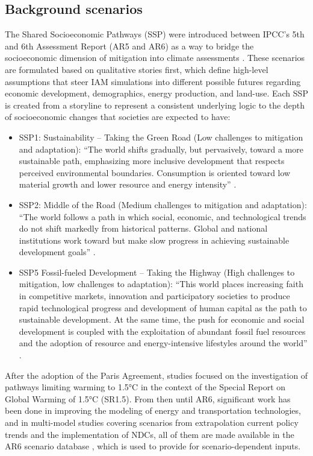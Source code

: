 \documentclass[a4paper,fleqn]{cas-dc}
\begin{document}
\subsection{Background scenarios}

The Shared Socioeconomic Pathways (SSP) were introduced between IPCC's 5th and 6th Assessment Report (AR5 and AR6) as a way to bridge the socioeconomic dimension of mitigation into climate assessments \cite{riahi_shared_2017}. These scenarios are formulated based on qualitative stories first, which define high-level assumptions that steer IAM simulations into different possible futures regarding economic development, demographics, energy production, and land-use. Each SSP is created from a storyline to represent a consistent underlying logic to the depth of socioeconomic changes that societies are expected to have:

\begin{itemize}
    \item SSP1: Sustainability – Taking the Green Road (Low challenges to mitigation and adaptation): “The world shifts gradually, but pervasively, toward a more sustainable path, emphasizing more inclusive development that respects perceived environmental boundaries. Consumption is oriented toward low material growth and lower resource and energy intensity” \cite{ssp1}.
    \item SSP2: Middle of the Road (Medium challenges to mitigation and adaptation): “The world follows a path in which social, economic, and technological trends do not shift markedly from historical patterns. Global and national institutions work toward but make slow progress in achieving sustainable development goals” \cite{ssp2}.
    \item SSP5 Fossil-fueled Development – Taking the Highway (High challenges to mitigation, low challenges to adaptation): “This world places increasing faith in competitive markets, innovation and participatory societies to produce rapid technological progress and development of human capital as the path to sustainable development. At the same time, the push for economic and social development is coupled with the exploitation of abundant fossil fuel resources and the adoption of resource and energy-intensive lifestyles around the world” \cite{ssp5}.
\end{itemize}

After the adoption of the Paris Agreement, studies focused on the investigation of pathways limiting warming to 1.5°C \cite{ipcc_wg3_an3} in the context of the Special Report on Global Warming of 1.5°C (SR1.5). From then until AR6, significant work has been done in improving the modeling of energy and transportation technologies, and in multi-model studies covering scenarios from extrapolation current policy trends and the implementation of NDCs, all of them are made available in the AR6 scenario database \cite{ar6_database}, which is used to provide for scenario-dependent inputs.
\end{document}
